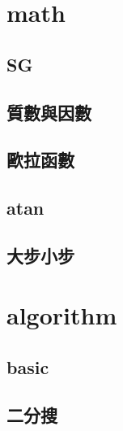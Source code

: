 %         

\section{math}
    \subsection{SG}
        
    \subsection{質數與因數}
          
    \subsection{歐拉函數}
        
    \subsection{atan}
        
    \subsection{大步小步}
        
        
\section{algorithm}
    \subsection{basic}
        
    \subsection{二分搜}
        
